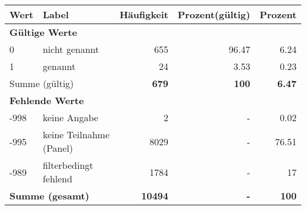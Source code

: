     \begin{longtable}{lXrrr}
     \toprule
     \textbf{Wert} & \textbf{Label} & \textbf{Häufigkeit} & \textbf{Prozent(gültig)} & \textbf{Prozent} \\
     \endhead
     \midrule
     \multicolumn{5}{l}{\textbf{Gültige Werte}}\\

     0 &
     \multicolumn{1}{X}{ nicht genannt   } &


       \num{655} &
       \num[round-mode=places,round-precision=2]{96,47} &
         \num[round-mode=places,round-precision=2]{6,24} \\

     1 &
     \multicolumn{1}{X}{ genannt   } &


       \num{24} &
       \num[round-mode=places,round-precision=2]{3,53} &
         \num[round-mode=places,round-precision=2]{0,23} \\
     \midrule
     \multicolumn{2}{l}{Summe (gültig)} &
       \textbf{\num{679}} &
     \textbf{100} &
       \textbf{\num[round-mode=places,round-precision=2]{6,47}} \\
     \multicolumn{5}{l}{\textbf{Fehlende Werte}}\\
       -998 &
       keine Angabe &
         \num{2} &
        - &
         \num[round-mode=places,round-precision=2]{0,02} \\
       -995 &
       keine Teilnahme (Panel) &
         \num{8029} &
        - &
         \num[round-mode=places,round-precision=2]{76,51} \\
       -989 &
       filterbedingt fehlend &
         \num{1784} &
        - &
         \num[round-mode=places,round-precision=2]{17} \\
     \midrule
     \multicolumn{2}{l}{\textbf{Summe (gesamt)}} &
          \textbf{\num{10494}} &
        \textbf{-} &
        \textbf{100} \\
     \bottomrule
     \end{longtable}
     

